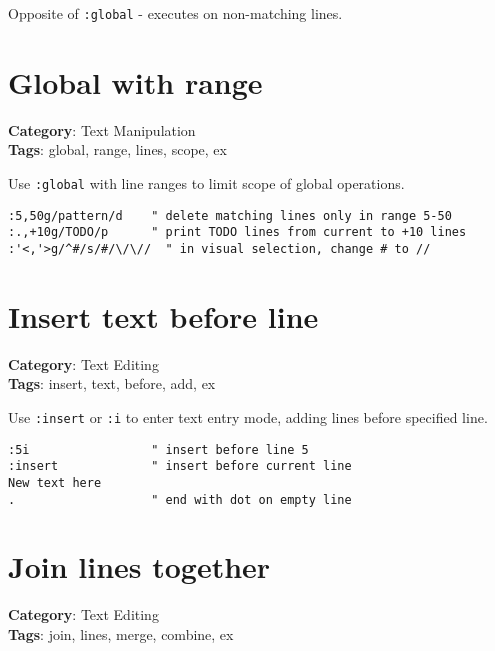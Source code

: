 {{{{{Opposite of {\footnotesize \Verb§:global§} - executes on non-matching lines.

\section{Global with range}

\textbf{Category}: Text Manipulation\\ \textbf{Tags}: global, range, lines, scope, ex
\vspace{0.5cm}

Use {\footnotesize \Verb§:global§} with line ranges to limit scope of global operations.

\begin{Exa*}{}
\begin{Verbatim}[fontsize=\footnotesize, breaklines, breakanywhere]
:5,50g/pattern/d    " delete matching lines only in range 5-50
:.,+10g/TODO/p      " print TODO lines from current to +10 lines
:'<,'>g/^#/s/#/\/\//  " in visual selection, change # to //
\end{Verbatim}
\end{Exa*}

\section{Insert text before line}

\textbf{Category}: Text Editing\\ \textbf{Tags}: insert, text, before, add, ex
\vspace{0.5cm}

Use {\footnotesize \Verb§:insert§} or {\footnotesize \Verb§:i§} to enter text entry mode, adding lines before specified line.

\begin{Exa*}{}
\begin{Verbatim}[fontsize=\footnotesize, breaklines, breakanywhere]
:5i                 " insert before line 5
:insert             " insert before current line
New text here
.                   " end with dot on empty line
\end{Verbatim}
\end{Exa*}

\section{Join lines together}

\textbf{Category}: Text Editing\\ \textbf{Tags}: join, lines, merge, combine, ex
\vspace{0.5cm}

}}}}}
